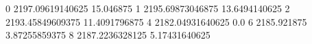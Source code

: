 0 2197.09619140625 15.046875
1 2195.69873046875 13.6494140625
2 2193.45849609375 11.4091796875
4 2182.04931640625 0.0
6 2185.921875 3.87255859375
8 2187.2236328125 5.17431640625
